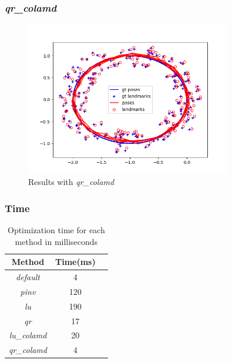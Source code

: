 \documentclass[12pt, a4paper]{article}
\begin{document}
\subsubsection{\textit{qr\_colamd}}
\begin{figure}[H]
  \centering
  \includegraphics[width=0.8\textwidth]{./results/linear/qr_colamd_2d_linear_loop_map.png}
  \caption{Results with \textit{qr\_colamd}}
\end{figure}
\subsubsection{Time}
\begin{table}[H]
  \centering
  \begin{tabular}{|c|c|c|}
  \hline
  \textbf{Method} & \textbf{Time(ms)}\\
  \hline
  \textit{default} & 4\\\hline
  \textit{pinv} & 120\\\hline
  \textit{lu} & 190\\\hline
  \textit{qr} & 17\\\hline
  \textit{lu\_colamd} & 20\\\hline
  \textit{qr\_colamd} & 4\\\hline
  \hline
  \end{tabular}
  \caption{Optimization time for each method in milliseconds}
  \end{table}
\end{document}
